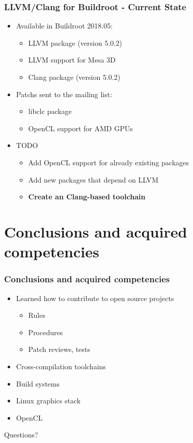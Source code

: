 \documentclass{smilebeamer}
\begin{document}
\begin{frame}
\frametitle{LLVM/Clang for Buildroot - Current State}
\begin{itemize}
  \item Available in Buildroot 2018.05:
  \begin{itemize}
    \item LLVM package (version 5.0.2)\checkmark
    \item LLVM support for Mesa 3D \checkmark
    \item Clang package (version 5.0.2)\checkmark
  \end{itemize}
  \item Patchs sent to the mailing list:
  \begin{itemize}
    \item libclc package
    \item OpenCL support for AMD GPUs
  \end{itemize}
  \item TODO
  \begin{itemize}
    \item Add OpenCL support for already existing packages
    \item Add new packages that depend on LLVM
    \item \textbf{Create an Clang-based toolchain}
  \end{itemize}
\end{itemize}
\end{frame}

\section{Conclusions and acquired competencies}

\begin{frame}
\frametitle{Conclusions and acquired competencies}
\begin{itemize}
  \item Learned how to contribute to open source projects \checkmark
  \begin{itemize}
    \item Rules
    \item Procedures
    \item Patch reviews, tests
  \end{itemize}
  \item Cross-compilation toolchains \checkmark
  \item Build systems \checkmark
  \item Linux graphics stack \checkmark
  \item OpenCL \checkmark
\end{itemize}
\end{frame}

\begin{frame}
\Huge{\centerline{Questions?}}
\end{frame}
\end{document}
